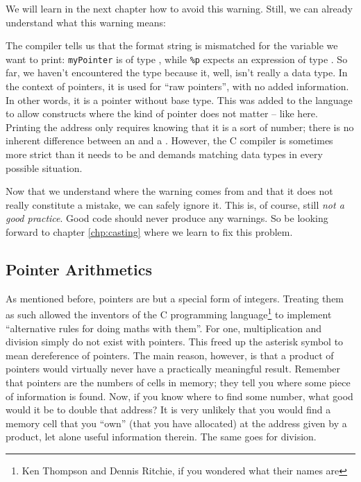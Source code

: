{{{{\begin{plusbox}
We will learn in the next chapter how to avoid this warning. Still, we can already understand what this warning means:

The compiler tells us that the format string is mismatched for the variable we want to print: \texttt{myPointer} is of type , while \texttt{\%p} expects an expression of type . So far, we haven't encountered the type  because it, well, isn't really a data type. In the context of pointers, it is used for \enquote{raw pointers}, with no added information. In other words, it is a pointer without base type. This was added to the language to allow constructs where the kind of pointer does not matter -- like here. Printing the address only requires knowing that it is a sort of number; there is no inherent difference between an  and a . However, the C compiler is sometimes more strict than it needs to be and demands matching data types in every possible situation.

Now that we understand where the warning comes from and that it does not really constitute a mistake, we can safely ignore it. This is, of course, still \emph{not a good practice}. Good code should never produce any warnings. So be looking forward to chapter \ref{chp:casting} where we learn to fix this problem.
\end{plusbox}


\subsection{Pointer Arithmetics}
As mentioned before, pointers are but a special form of integers. Treating them as such allowed the inventors of the C programming language\footnote{Ken Thompson and Dennis Ritchie, if you wondered what their names are} to implement \enquote{alternative rules for doing maths with them}. For one, multiplication and  division simply do not exist with pointers. This freed up the asterisk symbol to mean dereference of pointers. The main reason, however, is that a product of pointers would virtually never have a practically meaningful result. Remember that pointers are the numbers of cells in memory; they tell you where some piece of information is found. Now, if you know where to find some number, what good would it be to double that address? It is very unlikely that you would find a memory cell that you \enquote{own} (\ie that you have allocated) at the address given by a product, let alone useful information therein. The same goes for division.

}}}}
